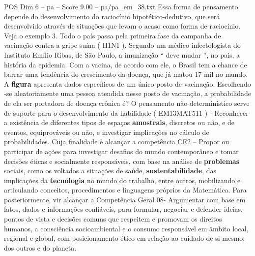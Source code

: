 \begin{textsample}{POS Dim 6 – pa – Score 9.00 – pa/pa\_em\_38.txt}
Essa forma de pensamento depende do desenvolvimento do raciocínio hipotético-dedutivo, que será desenvolvido através de situações que levam o acaso como forma de raciocínio.
Veja o exemplo 3.
Todo o país passa pela primeira fase da campanha de vacinação contra a gripe suína ( H1N1 ).
Segundo um médico infectologista do Instituto Emílio Ribas, de São Paulo, a imunização “ deve mudar ”, no país, a história da epidemia.
Com a vacina, de acordo com ele, o Brasil tem a chance de barrar uma tendência do crescimento da doença, que já matou 17 mil no mundo.
A \textbf{figura} apresenta dados específicos de um único posto de vacinação.
Escolhendo -se aleatoriamente uma pessoa atendida nesse posto de vacinação, a probabilidade de ela ser portadora de doença crônica é?
O pensamento não-determinístico serve de suporte para o desenvolvimento da habilidade ( EM13MAT511 ) - Reconhecer a existência de diferentes tipos de espaços \textbf{amostrais}, discretos ou não, e de eventos, equiprováveis ou não, e investigar implicações no cálculo de probabilidades.
Cuja finalidade é alcançar a competência CE2 – Propor ou participar de ações para investigar desafios do mundo contemporâneo e tomar decisões éticas e socialmente responsáveis, com base na análise de \textbf{problemas} sociais, como os voltados a situações de saúde, \textbf{sustentabilidade}, das implicações da \textbf{tecnologia} no mundo do trabalho, entre outros, mobilizando e articulando conceitos, procedimentos e linguagens próprios da Matemática.
Para posteriormente, vir alcançar a Competência Geral 08- Argumentar com base em fatos, dados e informações confiáveis, para formular, negociar e defender ideias, pontos de vista e decisões comuns que respeitem e promovam os direitos humanos, a consciência socioambiental e o consumo responsável em âmbito local, regional e global, com posicionamento ético em relação ao cuidado de si mesmo, dos outros e do planeta.

\end{textsample}

